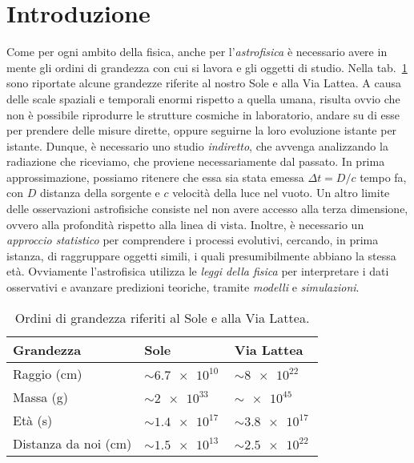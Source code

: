 \section{Introduzione}\label{sec:introduzione}
Come per ogni ambito della fisica, anche per l'\emph{astrofisica} è necessario avere in mente gli ordini di grandezza con cui si lavora e gli oggetti di studio. Nella tab.~\ref{tab:ordini-grandezza-sole-vialattea} sono riportate alcune grandezze riferite al nostro Sole e alla Via Lattea. A causa delle scale spaziali e temporali enormi rispetto a quella umana, risulta ovvio che non è possibile riprodurre le strutture cosmiche in laboratorio, andare su di esse per prendere delle misure dirette, oppure seguirne la loro evoluzione istante per istante. Dunque, è necessario uno studio \emph{indiretto}, che avvenga analizzando la radiazione che riceviamo, che proviene necessariamente dal passato. In prima approssimazione, possiamo ritenere che essa sia stata emessa $\Delta t = D / c$ tempo fa, con $D$ distanza della sorgente e $c$ velocità della luce nel vuoto. Un altro limite delle osservazioni astrofisiche consiste nel non avere accesso alla terza dimensione, ovvero alla profondità rispetto alla linea di vista. Inoltre, è necessario un \emph{approccio statistico} per comprendere i processi evolutivi, cercando, in prima istanza, di raggruppare oggetti simili, i quali presumibilmente abbiano la stessa età. Ovviamente l'astrofisica utilizza le \emph{leggi della fisica} per interpretare i dati osservativi e avanzare predizioni teoriche, tramite \emph{modelli} e \emph{simulazioni}.

\begin{table}
    \caption{Ordini di grandezza riferiti al Sole e alla Via Lattea.}
    \label{tab:ordini-grandezza-sole-vialattea}
    \centering
    \begin{tabular}{lll}
    \toprule
    Grandezza & Sole & Via Lattea  \\
    \midrule
    Raggio (\si{cm}) & $\sim \SI{6.7e10}{}$ & $\sim \SI{8e22}{}$ \\
    Massa (\si{g}) & $\sim \SI{2e33}{}$    & $\sim \SI{e45}{}$    \\
    Età (\si{s}) & $\sim \SI{1.4e17}{}$  & $\sim \SI{3.8e17}{}$  \\
    Distanza da noi (\si{cm}) & $\sim \SI{1.5e13}{}$  & $\sim \SI{2.5e22}{}$  \\
    \bottomrule
    \end{tabular}
\end{table}
